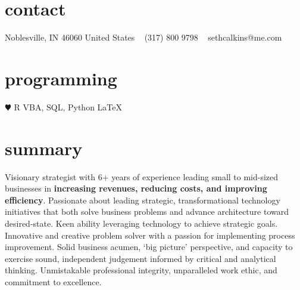 \documentclass[]{cv-style}          %
\begin{document}


\begin{aside}
%
\section{contact}
Noblesville, IN 46060
United States
~
(317) 800 9798
~
sethcalkins@me.com
%
\section{programming}
{\color{red} $\varheartsuit$} R
VBA, SQL, Python
\LaTeX{}
%
\end{aside}
\vspace{0.2cm}
\section{summary}
  \vspace{-0.2cm}
Visionary strategist with 6+ years of experience leading small to mid-sized businesses in \textbf{increasing revenues, reducing costs, and improving efficiency}. Passionate about leading strategic, transformational technology initiatives that both solve business problems and advance architecture toward desired-state. Keen ability leveraging technology to achieve strategic goals. Innovative and creative problem solver with a passion for implementing process improvement. Solid business acumen, `big picture' perspective, and capacity to exercise sound, independent judgement informed by critical and analytical thinking. Unmistakable professional integrity, unparalleled work ethic, and commitment to excellence.
\end{document}
